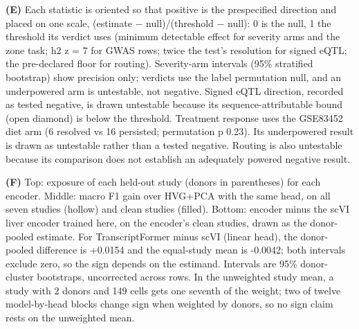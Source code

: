 \textbf{(E)} Each statistic is oriented so that positive is the prespecified direction and placed on one scale, (estimate − null)/(threshold − null): 0 is the null, 1 the threshold its verdict uses (minimum detectable effect for severity arms and the zone task; h2 z = 7 for GWAS rows; twice the test's resolution for signed eQTL; the pre-declared floor for routing). Severity-arm intervals (95\% stratified bootstrap) show precision only; verdicts use the label permutation null, and an underpowered arm is untestable, not negative. Signed eQTL direction, recorded as tested negative, is drawn untestable because its sequence-attributable bound (open diamond) is below the threshold. Treatment response uses the GSE83452 diet arm (6 resolved vs 16 persisted; permutation p 0.23). Its underpowered result is drawn as untestable rather than a tested negative. Routing is also untestable because its comparison does not establish an adequately powered negative result.

\textbf{(F)} Top: exposure of each held-out study (donors in parentheses) for each encoder. Middle: macro F1 gain over HVG+PCA with the same head, on all seven studies (hollow) and clean studies (filled). Bottom: encoder minus the scVI liver encoder trained here, on the encoder's clean studies, drawn as the donor-pooled estimate. For TranscriptFormer minus scVI (linear head), the donor-pooled difference is +0.0154 and the equal-study mean is -0.0042; both intervals exclude zero, so the sign depends on the estimand. Intervals are 95\% donor-cluster bootstraps, uncorrected across rows. In the unweighted study mean, a study with 2 donors and 149 cells gets one seventh of the weight; two of twelve model-by-head blocks change sign when weighted by donors, so no sign claim rests on the unweighted mean.
